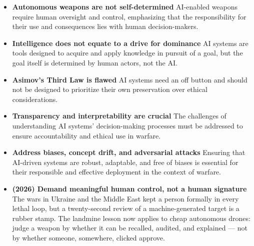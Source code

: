 \begin{itemize}
\item \textbf{Autonomous weapons are not self-determined} AI-enabled weapons require human oversight and control, emphasizing that the responsibility for their use and consequences lies with human decision-makers.
\item \textbf{Intelligence does not equate to a drive for dominance} AI systems are tools designed to acquire and apply knowledge in pursuit of a goal, but the goal itself is determined by human actors, not the AI.
\item \textbf{Asimov's Third Law is flawed} AI systems need an off button and should not be designed to prioritize their own preservation over ethical considerations.
\item \textbf{Transparency and interpretability are crucial} The challenges of understanding AI systems' decision-making processes must be addressed to ensure accountability and ethical use in warfare.
\item \textbf{Address biases, concept drift, and adversarial attacks} Ensuring that AI-driven systems are robust, adaptable, and free of biases is essential for their responsible and effective deployment in the context of warfare.
\item \textbf{(2026) Demand meaningful human control, not a human signature} The wars in Ukraine and the Middle East kept a person formally in every lethal loop, but a twenty-second review of a machine-generated target is a rubber stamp. The landmine lesson now applies to cheap autonomous drones: judge a weapon by whether it can be recalled, audited, and explained --- not by whether someone, somewhere, clicked approve.
\end{itemize}
